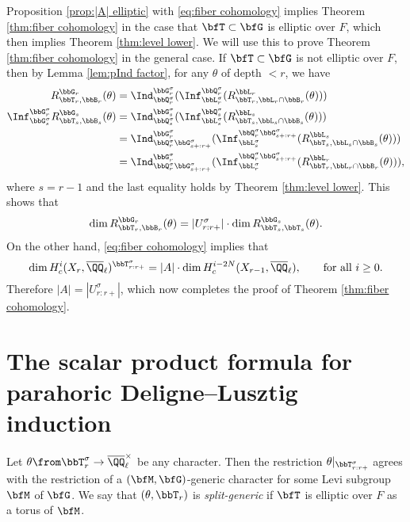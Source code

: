 Proposition \ref{prop:|A| elliptic} with \eqref{eq:fiber cohomology} implies Theorem \ref{thm:fiber cohomology} in the case that $\bfT \subset \bfG$ is elliptic over $F$, which then implies Theorem \ref{thm:level lower}. We will use this to prove Theorem \ref{thm:fiber cohomology} in the general case. If $\bfT \subset \bfG$ is not elliptic over $F$, then by Lemma \ref{lem:pInd factor}, for any $\theta$ of depth $<r$, we have 
\begin{align*}
  R_{\bbT_r,\bbB_r}^{\bbG_r}(\theta) 
  &= \Ind_{\bbQ_r^\sigma}^{\bbG_r^\sigma}(\Inf_{\bbL_r^\sigma}^{\bbQ_r^\sigma}(R_{\bbT_r,\bbL_r \cap \bbB_r}^{\bbL_r}(\theta))) \\
  \Inf_{\bbG_s^\sigma}^{\bbG_r^\sigma} R_{\bbT_s,\bbB_s}^{\bbG_s}(\theta) 
  &= \Ind_{\bbQ_s^\sigma}^{\bbG_s^\sigma}(\Inf_{\bbL_s^\sigma}^{\bbQ_s^\sigma}(R_{\bbT_s,\bbL_s \cap \bbB_s}^{\bbL_s}(\theta))) \\
  &= \Ind_{\bbQ_r^\sigma \bbG_{s+:r+}^\sigma}^{\bbG_r^\sigma}(\Inf_{\bbL_s^\sigma}^{\bbQ_r^\sigma \bbG_{s+:r+}^\sigma}(R_{\bbT_s,\bbL_s \cap \bbB_s}^{\bbL_s}(\theta))) \\
  &= \Ind_{\bbQ_r^\sigma \bbG_{s+:r+}^\sigma}^{\bbG_r^\sigma}(\Inf_{\bbL_r^\sigma}^{\bbQ_r^\sigma \bbG_{s+:r+}^\sigma}(R_{\bbT_r,\bbL_r \cap \bbB_r}^{\bbL_r}(\theta))),
\end{align*}
where $s = r-1$ and the last equality holds by Theorem \ref{thm:level lower}. This shows that
\begin{equation*}
  \dim R_{\bbT_r,\bbB_r}^{\bbG_r}(\theta) = |U_{r:r+}^\sigma| \cdot \dim R_{\bbT_s,\bbT_s}^{\bbG_s}(\theta).
\end{equation*} 
On the other hand, \eqref{eq:fiber cohomology} implies that
\begin{equation}
  \dim H_c^i(X_r, \overline \QQ_\ell)^{\bbT_{r:r+}^\sigma} = |A| \cdot \dim H_c^{i-2N}(X_{r-1}, \overline \QQ_\ell), \qquad \text{for all $i \geq 0$}.
\end{equation}
Therefore $|A| = |U_{r:r+}^\sigma|$, which now completes the proof of Theorem \ref{thm:fiber cohomology}.

\section{The scalar product formula for parahoric Deligne--Lusztig induction}\label{sec:scalar}

\begin{definition}
  Let $\theta \from \bbT_r^\sigma \to \overline \QQ_\ell^\times$ be any character. Then the restriction $\theta|_{\bbT_{r:r+}^\sigma}$ agrees with the restriction of a $(\bfM,\bfG)$-generic character for some Levi subgroup $\bfM$ of $\bfG$. 
  We say that  $(\theta,\bbT_r)$ is \textit{split-generic} if $\bfT$ is elliptic over $F$ as a torus of $\bfM$. \end{definition}

